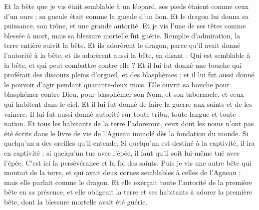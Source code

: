 \begin{multicols}{2}
Et la bête que je vis était semblable à un léopard, ses pieds étaient comme ceux d'un ours ; sa gueule était comme la gueule d'un lion{}. Et le dragon lui donna sa puissance, son trône, et une grande autorité.
Et je vis l'une de ses têtes comme blessée à mort, mais sa blessure mortelle fut guérie. Remplie d’admiration, la terre entière suivit la bête.
Et ils adorèrent le dragon, parce qu’il avait donné l’autorité à la bête, et ils adorèrent aussi la bête, en disant : Qui est semblable à la bête, et qui peut combattre contre elle ?
Et il lui fut donné une bouche qui proférait des discours pleins d’orgueil, et des blasphèmes ; et il lui fut aussi donné le pouvoir d’agir pendant quarante-deux mois.
Elle ouvrit sa bouche pour blasphémer contre Dieu, pour blasphémer son Nom, et son tabernacle, et ceux qui habitent dans le ciel.
Et il lui fut donné de faire la guerre aux saints et de les vaincre. Il lui fut aussi donné autorité sur toute tribu, toute langue et toute nation.
Et tous les habitants de la terre l’adoreront, ceux dont les noms n’ont pas été écrits dans le livre de vie de l'Agneau immolé dès la fondation du monde.
Si quelqu'un a des oreilles qu'il entende.
Si quelqu'un est destiné à la captivité, il ira en captivité ; si quelqu'un tue avec l'épée, il faut qu'il soit lui-même tué avec l'épée. C’est ici la persévérance et la foi des saints.
Puis je vis une autre bête qui montait de la terre{}, et qui avait deux cornes semblables à celles de l'Agneau ; mais elle parlait comme le dragon.
Et elle exerçait toute l’autorité de la première bête en sa présence, et elle obligeait la terre et ses habitants à adorer la première bête, dont la blessure mortelle avait été guérie{}.

\end{multicols}
